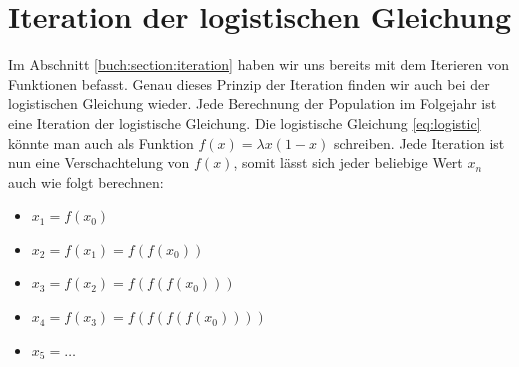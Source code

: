 %
%
%
\section{Iteration der logistischen Gleichung
\label{logistic:section:analyse}}

Im Abschnitt \ref{buch:section:iteration} haben wir uns
bereits mit dem Iterieren von Funktionen befasst. 
Genau dieses Prinzip der Iteration finden wir auch bei
der logistischen Gleichung wieder. 
Jede Berechnung der Population im Folgejahr ist 
eine Iteration der logistische Gleichung.
Die logistische Gleichung \eqref{eq:logistic} könnte man 
auch als Funktion $f(x) = \lambda x(1-x)$ schreiben.
Jede Iteration ist nun eine Verschachtelung von $f(x)$,
somit lässt sich jeder beliebige Wert $x_n$ auch wie folgt berechnen:  
\begin{itemize}
    \item $x_1 = f(x_0)$
    \item $x_2 = f(x_1) = f(f(x_0))$
    \item $x_3 = f(x_2) = f(f(f(x_0)))$
    \item $x_4 = f(x_3) = f(f(f(f(x_0))))$
    \item $x_5 = \dots$
\end{itemize}

